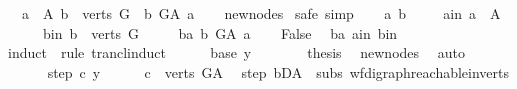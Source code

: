\begin{isabellebody}
\ \ {\isachardoublequoteopen}{\isasymforall}a\ {\isasymin}\ A{\isachardot}{\kern0pt}\ {\isasymforall}b\ {\isasymin}\ verts\ G{\isachardot}{\kern0pt}\ {\isasymnot}\ b\ {\isasymrightarrow}\isactrlsup {\isacharplus}{\kern0pt}\isactrlbsub G{\isacharunderscore}{\kern0pt}A\isactrlesub \ a{\isachardoublequoteclose}\isanewline
%
\isadelimproof
\ \ %
\endisadelimproof
%
\isatagproof
{}\isamarkupfalse%
\ new{\isacharunderscore}{\kern0pt}nodes\ \isanewline
{}\isamarkupfalse%
{\isacharparenleft}{\kern0pt}safe{\isacharcomma}{\kern0pt}\ simp{\isacharparenright}{\kern0pt}\isanewline
\ \ \isamarkupfalse%
\ a\ b\ \isanewline
\ \ \isamarkupfalse%
\ a{\isacharunderscore}{\kern0pt}in{\isacharcolon}{\kern0pt}\ {\isachardoublequoteopen}a\ {\isasymin}\ A{\isachardoublequoteclose}\isanewline
\ \ \ \ \ b{\isacharunderscore}{\kern0pt}in{\isacharcolon}{\kern0pt}\ {\isachardoublequoteopen}b\ {\isasymin}\ verts\ G{\isachardoublequoteclose}\isanewline
\ \ \ \ \ ba{\isacharcolon}{\kern0pt}\ {\isachardoublequoteopen}b\ {\isasymrightarrow}\isactrlsup {\isacharplus}{\kern0pt}\isactrlbsub G{\isacharunderscore}{\kern0pt}A\isactrlesub \ a{\isachardoublequoteclose}\isanewline
\ \ \isamarkupfalse%
\ False\ \isamarkupfalse%
\ ba\ a{\isacharunderscore}{\kern0pt}in\ b{\isacharunderscore}{\kern0pt}in\isanewline
\ \ \isamarkupfalse%
{\isacharparenleft}{\kern0pt}induct\ \ rule{\isacharcolon}{\kern0pt}\ trancl{\isacharunderscore}{\kern0pt}induct{\isacharparenright}{\kern0pt}\isanewline
\ \ \ \ \isamarkupfalse%
\ {\isacharparenleft}{\kern0pt}base\ y{\isacharparenright}{\kern0pt}\isanewline
\ \ \ \ \isamarkupfalse%
\ \isamarkupfalse%
\ {\isacharquery}{\kern0pt}thesis\ \isamarkupfalse%
\ new{\isacharunderscore}{\kern0pt}nodes\ \isamarkupfalse%
\ auto\ \isanewline
\ \ \isamarkupfalse%
\isanewline
\ \ \ \ \isamarkupfalse%
\ {\isacharparenleft}{\kern0pt}step\ c\ y{\isacharparenright}{\kern0pt}\isanewline
\ \ \ \ \isamarkupfalse%
\ {\isachardoublequoteopen}c\ {\isasymin}\ verts\ G{\isacharunderscore}{\kern0pt}A{\isachardoublequoteclose}\ \isamarkupfalse%
\ step{\isacharparenleft}{\kern0pt}{}{\isacharparenright}{\kern0pt}\ bD{\isacharunderscore}{\kern0pt}A\ \ subs{\isacharparenleft}{\kern0pt}{}{\isacharparenright}{\kern0pt}\ wf{\isacharunderscore}{\kern0pt}digraph{\isachardot}{\kern0pt}reachable{}{\isacharunderscore}{\kern0pt}in{\isacharunderscore}{\kern0pt}verts{\isacharparenleft}{\kern0pt}{}{\isacharparenright}{\kern0pt}\isanewline

\end{isabellebody}
